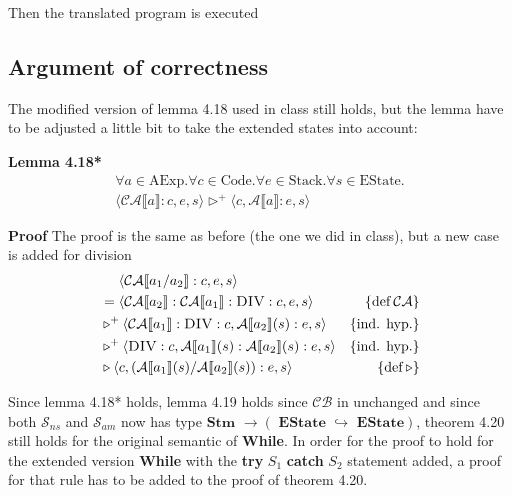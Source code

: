 \documentclass[11pt,oneside,a4paper]{article}
\begin{document}
Then the translated program is executed


\subsection*{Argument of correctness}
The modified version of lemma 4.18 used in class still holds, 
but the lemma have to be adjusted a little bit to take the 
extended states into account:

{\bf Lemma 4.18*} 
\begin{align*}
\forall a \in \text{AExp}.\forall c \in \text{Code}.\forall e \in \text{Stack}.
\forall s \in \text{EState}. \\
\langle\mathcal{CA}\llbracket a \rrbracket:c, e, s \rangle \triangleright^+ 
\langle c, \mathcal{A}\llbracket a \rrbracket:e, s \rangle
\end{align*}

{\bf Proof}
The proof is the same as before (the one we did in class), 
but a new case is added for division
\begin{align*}
[a \equiv a_1 / a_2]&\:\:\:\:\:\: \langle \mathcal{CA}\llbracket a_1 / a_2 
\rrbracket:c,
e, s \rangle \\
&= \langle \mathcal{CA}\llbracket a_2 \rrbracket:\mathcal{CA} \llbracket a_1
\rrbracket:\textsc{DIV}:c, e, s\rangle & \{\text{def}\:\mathcal{CA}\} \\
&\triangleright^+ \langle \mathcal{CA} \llbracket a_1 \rrbracket:\textsc{DIV}:c,
\mathcal{A}\llbracket a_2 \rrbracket(s):e, s \rangle & \{\text{ind. hyp.}\} \\
&\triangleright^+ \langle \textsc{DIV}:c,
\mathcal{A}\llbracket a_1 \rrbracket(s):\mathcal{A}\llbracket a_2 
\rrbracket(s):e, 
s \rangle & \{\text{ind. hyp.}\} \\
&\triangleright \langle c, (\mathcal{A}\llbracket a_1 \rrbracket(s) /
\mathcal{A}\llbracket a_2 \rrbracket(s)):e, s \rangle & \{\text{def}\: 
\triangleright\} \\
\end{align*}

Since lemma 4.18* holds, lemma 4.19 holds since \(\mathcal{CB}\) in unchanged  
and since both 
\(\mathcal{S}_{ns}\) and \(\mathcal{S}_{am}\) now has type \(\textbf{Stm } 
\rightarrow (\textbf{ EState }
\hookrightarrow \textbf{ EState})\), 
theorem 4.20 still holds for the original semantic of \textbf{While}. In order
for the proof to hold for the extended version \textbf{While} with the {\bf
try} \(S_1\) {\bf catch} \(S_2\) statement added, 
a proof for that rule has to be added to the proof of theorem 4.20.
\end{document}
